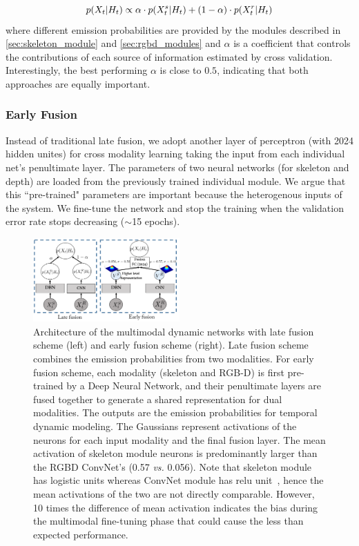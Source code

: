 \begin{equation}
p(X_t | H_t)  \propto  \alpha \cdot p(X_t^s | H_t) + (1-\alpha)\cdot p(X_t^r | H_t)
\end{equation}
where different emission probabilities are provided by the modules described in \ref{sec:skeleton_module} and \ref{sec:rgbd_modules} and $\alpha$ is a coefficient that controls the contributions of each source of information estimated by cross validation.
Interestingly, the best performing $\alpha$ is close to $0.5$, indicating that both approaches are equally important.


\subsubsection{Early Fusion}\label{early_fusion}

Instead of traditional late fusion, we adopt another layer of perceptron (with 2024 hidden unites) for cross modality learning taking the input from each individual net's penultimate layer.
The parameters of two neural networks (for skeleton and depth) are loaded from the previously trained individual module. We argue that this ``pre-trained" parameters are important because the heterogenous inputs of the system.  We fine-tune the network and stop the training when the validation error rate stops decreasing ($\sim$15 epochs).

\begin{figure}[t]
  \centering
  \includegraphics[width=0.5\textwidth]{images/Fusion_combined}
  \caption{
    Architecture of the multimodal dynamic networks with late fusion scheme (left) and early fusion scheme (right).  Late fusion scheme combines the emission probabilities from two modalities. For early fusion scheme, each modality (skeleton and RGB-D) is first pre-trained by a Deep Neural Network, and their penultimate layers are fused together to generate a shared representation for dual modalities. The outputs are the emission probabilities \emissionprob for temporal dynamic modeling. The Gaussians represent activations of the neurons for each input modality and the final fusion layer. The mean activation of skeleton module neurons is predominantly larger than the RGBD ConvNet's (0.57 \emph{vs.} 0.056). Note that skeleton module has logistic units whereas ConvNet module has relu unit~\cite{DBLP:journals/corr/PigouODHD15}, hence the mean activations of the two are not directly comparable. However, 10 times the difference of mean activation indicates the bias during the multimodal fine-tuning phase that could cause the less than expected performance.
  }\label{fig:fusion}
\end{figure}



\endinput
